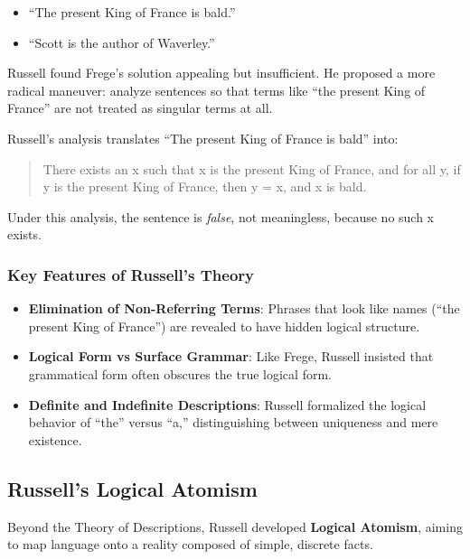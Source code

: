 \documentclass[12pt]{article}
\newcommand{\tightlist}{\itemsep 0pt\parskip 0pt\parsep 0pt}
\begin{document}
\begin{itemize}
\tightlist
\item
  ``The present King of France is bald.''
\item
  ``Scott is the author of Waverley.''
\end{itemize}

Russell found Frege's solution appealing but insufficient. He proposed a
more radical maneuver: analyze sentences so that terms like ``the
present King of France'' are not treated as singular terms at all.

Russell's analysis translates ``The present King of France is bald''
into:

\begin{quote}
There exists an x such that x is the present King of France, and for all
y, if y is the present King of France, then y = x, and x is bald.
\end{quote}

Under this analysis, the sentence is \emph{false}, not meaningless,
because no such x exists.

\hypertarget{key-features-of-russells-theory}{%
\subsubsection{Key Features of Russell's
Theory}\label{key-features-of-russells-theory}}

\begin{itemize}
\item
  \textbf{Elimination of Non-Referring Terms}: Phrases that look like
  names (``the present King of France'') are revealed to have hidden
  logical structure.
\item
  \textbf{Logical Form vs Surface Grammar}: Like Frege, Russell insisted
  that grammatical form often obscures the true logical form.
\item
  \textbf{Definite and Indefinite Descriptions}: Russell formalized the
  logical behavior of ``the'' versus ``a,'' distinguishing between
  uniqueness and mere existence.
\end{itemize}

\hypertarget{russells-logical-atomism}{%
\subsection{Russell's Logical Atomism}\label{russells-logical-atomism}}

Beyond the Theory of Descriptions, Russell developed \textbf{Logical
Atomism}, aiming to map language onto a reality composed of simple,
discrete facts.
\end{document}
